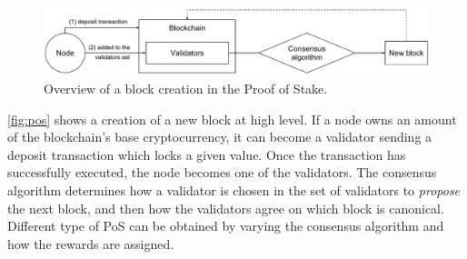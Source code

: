 \begin{figure}
    \begin{center}
        \includegraphics[width=\textwidth]{./res/img/pos.pdf}
    \end{center}
    \caption{Overview of a block creation in the Proof of Stake.}
    \label{fig:pos}
\end{figure}

\autoref{fig:pos} shows a creation of a new block at high level. If a node owns
an amount of the blockchain's base cryptocurrency, it can become a validator
sending a deposit transaction which locks a given value. Once the transaction
has successfully executed, the node becomes one of the validators. The consensus
algorithm determines how a validator is chosen in the set of validators to
\emph{propose} the next block, and then how the validators agree on which block
is canonical. Different type of PoS can be obtained by varying the consensus
algorithm and how the rewards are assigned.
